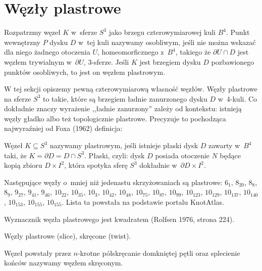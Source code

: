 \section{Węzły plastrowe} %
\label{sec:slice}
Rozpatrzmy węzeł $K$ w~sferze $S^3$ jako brzegu czterowymiarowej kuli $B^4$.
Punkt wewnętrzny $P$ dysku $D$ w~tej kuli nazywamy osobliwym, jeśli nie można wskazać dla niego żadnego otoczenia $U$, homeomorficznego z~$B^4$, takiego że $\partial U \cap D$ jest węzłem trywialnym w~$\partial U$, 3-sferze.
Jeśli $K$ jest brzegiem dysku $D$ pozbawionego punktów osobliwych, to jest on węzłem plastrowym.

W tej sekcji opiszemy pewną czterowymiarową własność węzłów.
Węzły plastrowe na sferze $S^3$ to takie, które są brzegiem ładnie zanurzonego dysku $D$ w~4-kuli.
Co dokładnie znaczy wyrażenie ,,ładnie zanurzony'' zależy od kontekstu: istnieją węzły gładko albo też topologicznie plastrowe.
Precyzuje to pochodząca najwyraźniej od Foxa (1962) definicja:

\begin{definition}
    Węzeł $K \subseteq S^3$ nazywamy plastrowym, jeśli istnieje płaski dysk $D$ zawarty w~$B^4$ taki, że $K = \partial D = D \cap S^3$.
    Płaski, czyli: dysk $D$ posiada otoczenie $N$ będące kopią zbioru $D \times I^2$, która spotyka sferę $S^3$ dokładnie w~$\partial D \times I^2$.
\end{definition}

Następujące węzły o~mniej niż jedenastu skrzyżowaniach są plastrowe: $6_1$, $8_{20}$, $8_{8}$, $8_{9}$, $9_{27}$, $9_{41}$, $9_{46}$, $10_{22}$, $10_{35}$, $10_{3}$, $10_{42}$, $10_{48}$, $10_{75}$, $10_{87}$, $10_{99}$, $10_{123}$, $10_{129}$, $10_{137}$, $10_{140}$, $10_{153}$, $10_{155}$, $10_{155}$.
Lista ta powstała na podstawie portalu KnotAtlas.

\begin{proposition} \label{slice_square_det}
    Wyznacznik węzła plastrowego jest kwadratem (Rolfsen 1976, strona 224).
\end{proposition}

Węzły plastrowe (slice), skręcone (twist).

\begin{definition} \label{twist_knots}
    Węzeł powstały przez $n$-krotne półskręcanie domkniętej pętli oraz splecienie końców nazywamy węzłem skręconym.
\end{definition}

